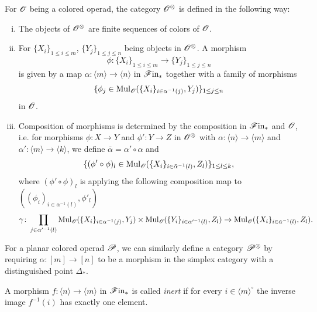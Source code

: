 \begin{defin}\label{def:Ox} For $\O$ being a colored operad, the category $\Ox$
    is defined in the following way:
    \begin{enumerate}[(i)]
        \item The objects of $\Ox$ are finite sequences of colors of $\O$.
        \item For $\{X_i\}_{1 \leq i \leq m}$, $\{Y_j\}_{1 \leq j \leq n}$ being
        objects in $\Ox$. A morphism 
        \[
            \phi \colon \{X_i\}_{1 \leq i \leq m} \to \{Y_j\}_{1 \leq j \leq n}
        \]
        is given by a map $\alpha \colon \langle m \rangle \to \langle n
        \rangle$ in $\Fin$ together with a family of morphisms
        \[
            \{ \phi_j \in \Mul_{\O}(\{X_i\}_{i \in \alpha^{-1}(j)}, Y_j)\}_{1 \leq j \leq n}
        \]
        in $\O$.
        \item Composition of morphisms is determined by the composition in
        $\Fin$ and $\O$, i.e. for morphisms $\phi \colon X \to Y$ and $\phi'
        \colon Y \to Z$ in $\Ox$  with $\alpha \colon \langle n \rangle \to
        \langle m \rangle$ and $\alpha' \colon \langle m \rangle \to \langle k
        \rangle$, we define $\bar{\alpha} = \alpha'\circ \alpha$ and
        \[
            \{(\phi' \circ \phi)_l \in  \Mul_{\O}(\{X_i\}_{i \in \bar{\alpha}^{-1}(l)}, Z_l)\}_{1 \leq l \leq k},
        \]
        where $(\phi' \circ \phi)_l$ is applying the following composition map
        to $((\phi_i)_{i \in \alpha^{-1}(l)}, \phi'_l)$
        \[
            \gamma \colon \prod_{j \in \alpha'^{-1}(l)} \Mul_{\O}(\{X_i\}_{i \in \alpha^{-1}(j)},Y_j) \times \Mul_{\O}(\{Y_i\}_{i \in \alpha'^{-1}(l)},Z_l) \to \Mul_{\O}(\{X_i\}_{i \in \bar{\alpha}^{-1}(l)},Z_l).
        \] 
    \end{enumerate}
\end{defin}

\begin{rem}
    For a planar colored operad $\P$, we can similarly define a category
    $\P^{\otimes}$ by requiring $\alpha \colon [m] \to [n]$ to be a morphism in
    the simplex category with a distinguished point $\Delta_{\ast}$.   
\end{rem}

\begin{defin}
    A morphism $f \colon \langle n \rangle \to \langle m \rangle$ in $\Fin$ is
    called {\em inert} if for every $i \in \langle m \rangle^{\circ}$ the
    inverse image $f^{-1}(i)$ has exactly one element.
\end{defin}

